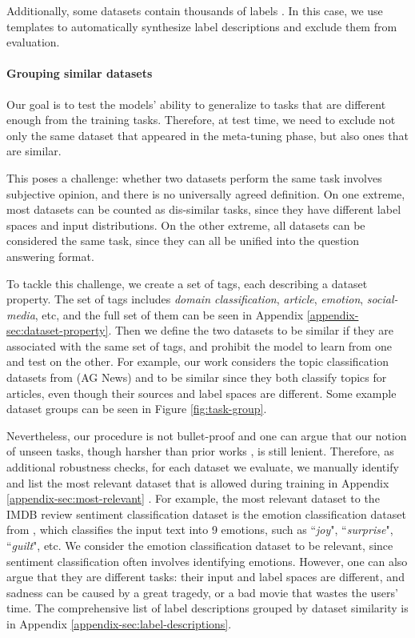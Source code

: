 Additionally, some datasets contain thousands of labels \cite{chalkidis-etal-2019-large, allaway-mckeown-2020-zero}. In this case, we use templates to automatically synthesize label descriptions and exclude them from evaluation.

\paragraph{Grouping similar datasets} Our goal is to test the models' ability to generalize to tasks that are different enough from the training tasks. Therefore, at test time, we need to exclude not only the same dataset that appeared in the meta-tuning phase, but also ones that are similar.

This poses a challenge: whether two datasets perform the same task involves subjective opinion, and there is no universally agreed definition. On one extreme, most datasets can be counted as dis-similar tasks, since they have different label spaces and input distributions. On the other extreme, all datasets can be considered the same task, since they can all be unified into the question answering format.

To tackle this challenge, we create a set of tags, each describing a dataset property. The set of tags includes \textit{domain classification}, \textit{article}, \textit{emotion}, \textit{social-media}, etc, and the full set of them can be seen in Appendix \ref{appendix-sec:dataset-property}.
Then we define the two datasets to be similar if they are associated with the same set of tags, and prohibit the model to learn from one and test on the other. For example, our work considers the topic classification datasets from \citet{10.5555/2969239.2969312} (AG News) and \citet{yin-etal-2019-benchmarking} to be similar since they both classify topics for articles, even though their sources and label spaces are different. Some example dataset groups can be seen in Figure \ref{fig:task-group}.

Nevertheless, our procedure is not bullet-proof and one can argue that our notion of unseen tasks, though harsher than prior works \cite{yin-etal-2019-benchmarking, pushp2017train}, is still lenient. Therefore, as additional robustness checks, for each dataset we evaluate, we manually identify and list the most relevant dataset that is allowed during training in Appendix \ref{appendix-sec:most-relevant} . For example, the most relevant dataset to the IMDB review sentiment classification dataset is the emotion classification dataset from \citet{yin-etal-2019-benchmarking}, which classifies the input text into 9 emotions, such as ``\textit{joy}", ``\textit{surprise}", ``\textit{guilt}", etc. We consider the emotion classification dataset to be relevant, since sentiment classification often involves identifying emotions. However, one can also argue that they are different tasks: their input and label spaces are different, and sadness can be caused by a great tragedy, or a bad movie that wastes the users' time. The comprehensive list of label descriptions grouped by dataset similarity is in Appendix \ref{appendix-sec:label-descriptions}.

